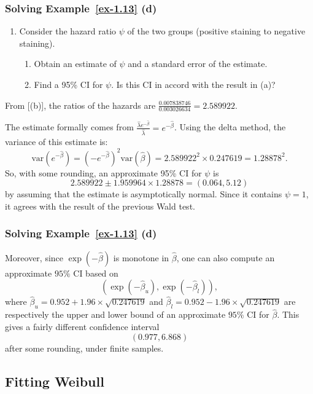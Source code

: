 \documentclass{beamer}
\newcommand{\currentsubsection}{}
\let\oldsubsection\subsection
\renewcommand{\subsection}[1]{\oldsubsection{#1}\renewcommand{\currentsubsection}{#1}}
\begin{document}
\begin{frame} \frametitle{Solving Example~\ref{ex-1.13} (d)}

\begin{enumerate}
\item [(d)] Consider the hazard ratio $\psi$ of the two groups (positive
  staining to negative staining).
  \begin{enumerate}
  \item [(d.1)] Obtain an estimate of $\psi$ and a
    standard error of the estimate.
  \item [(d.2)] Find a 95\% CI for $\psi$.  Is this CI in accord
    with the result in (a)?
  \end{enumerate}
\end{enumerate}

From [(b)], the ratios of the hazards are $\frac{0.007838746}{0.003026634} = 2.589922$. 

The estimate formally comes from $\frac{\hat{\lambda}e^{- \hat{\beta}}}{\hat{\lambda}} = e^{-\hat{\beta}}$.  
Using the delta method, the variance of this estimate is:
\[
\mbox{var}(e^{-\hat \beta}) = (-e^{-\hat \beta})^2 \mbox{var}(\hat \beta) 
 = 2.589922 ^2 \times  0.247619 = 1.28878
^2.
 \]
So, with some rounding, an approximate 95\% CI for $\psi$ is
\[
2.589922 \pm 1.959964\times 1.28878=(0.064 , 5.12 )
\]
by assuming that the estimate is asymptotically normal. Since  it contains $\psi=1$, it agrees with the result of the previous Wald test.
\end{frame}


\begin{frame} \frametitle{Solving Example~\ref{ex-1.13} (d)}
Moreover, since $\exp(-\hat{\beta})$ is monotone in $\hat{\beta}$, one can also compute an approximate $95\%$ CI based on 
\[
(\exp(- \hat{\beta}_u), \exp(- \hat{\beta}_l)),
\]
where $\hat{\beta}_u = 0.952 +1.96 \times \sqrt{0.247619}$ and $\hat{\beta}_l = 0.952-  1.96 \times \sqrt{0.247619}$ are respectively the upper and lower bound of an approximate $95\%$ CI for $\hat{\beta}$. This gives a fairly different confidence interval
\[
(0.977,   6.868)
\] 
after some rounding, under finite samples. 
\end{frame}


\subsection{Fitting Weibull}
\end{document}
